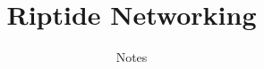 \documentclass[12pt,pdftex,a4paper]{scrbook}
\begin{document}
	\thispagestyle{empty}
	\title{Riptide Networking}
	\subtitle{Notes}
	\maketitle
	
	\newpage
	\tableofcontents
	
	
	
	
	
\end{document}

